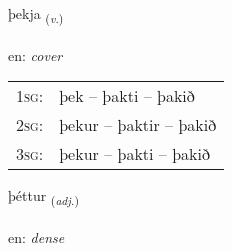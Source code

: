 \documentclass[frontgrid, backgrid]{flacards}\usepackage[]{graphicx}\usepackage[]{xcolor}
\begin{document}
\renewcommand{\flhead}{\vskip5pt \fboxsep=0pt {\small\bfseries\footnotesize Sagnorð | Verb}}
\renewcommand{\fcfoot}{\vskip5pt \fboxsep=0pt \hspace{2pt}{\small\bfseries\footnotesize 3K}}

\renewcommand{\blhead}{\vskip5pt {\small\bfseries\footnotesize Sagnorð | Verb }}
\renewcommand{\bcfoot}{\vskip5pt \hspace{2pt}{\small\bfseries\footnotesize 3K}}


{þekja \small{\textsubscript{(\textit{v.})}} \\[1ex] %
\textphonetic{[θɛːca]} \\
en: \emph{cover} \\  [2ex]
\renewcommand*{\arraystretch}{0.8}
\begin{tabular}{p{1cm}l}
\textsc{1sg}: & þek -- þakti -- þakið \\ 
\textsc{2sg}: & þekur -- þaktir -- þakið \\ 
\textsc{3sg}: & þekur -- þakti -- þakið \\ 
\end{tabular}
}

\renewcommand{\flhead}{\vskip5pt \fboxsep=0pt {\small\bfseries\footnotesize Lýsingarorð | Adjective}}
\renewcommand{\fcfoot}{\vskip5pt \fboxsep=0pt \hspace{2pt}{\small\bfseries\footnotesize 3K}}

\renewcommand{\blhead}{\vskip5pt {\small\bfseries\footnotesize Lýsingarorð | Adjective }}
\renewcommand{\bcfoot}{\vskip5pt \hspace{2pt}{\small\bfseries\footnotesize 3K}}


{þéttur \small{\textsubscript{(\textit{adj.})}} \\[1ex] %
\textphonetic{[θjɛhtʏr]} \\
en: \emph{dense} \\  [2ex]
\renewcommand*{\arraystretch}{0.8}
}
\end{document}
